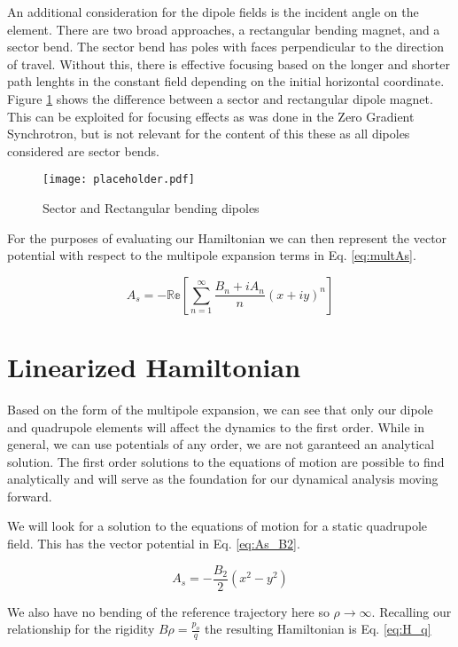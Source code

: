 An additional consideration for the dipole fields is the incident angle on the element. There are two broad approaches, a rectangular bending magnet, and a sector bend. The sector bend has poles with faces perpendicular to the direction of travel. Without this, there is effective focusing based on the longer and shorter path lenghts in the constant field depending on the initial horizontal coordinate. Figure \ref{fig:sector} shows the difference between a sector and rectangular dipole magnet. This can be exploited for focusing effects as was done in the Zero Gradient Synchrotron, but is not relevant for the content of this these as all dipoles considered are sector bends.

\begin{figure} \label{fig:sector}
	\centering
	\texttt{[image: placeholder.pdf]}
	\caption{Sector and Rectangular bending dipoles}
\end{figure}


For the purposes of evaluating our Hamiltonian we can then represent the vector potential with respect to the multipole expansion terms in Eq. \ref{eq:multAs}.

\begin{equation} \label{eq:multAs}
	A_s  =  - \mathbb{Re} \left[ \sum_{n=1}^{\infty} \frac{B_n + i A_n}{n} (x+iy)^n \right]
\end{equation}


\section{Linearized Hamiltonian} \label{sec:linHam}
Based on the form of the multipole expansion, we can see that only our dipole and quadrupole elements will affect the dynamics to the first order. While in general, we can use potentials of any order, we are not garanteed an analytical solution. The first order solutions to the equations of motion are possible to find analytically and will serve as the foundation for our dynamical analysis moving forward.

We will look for a solution to the equations of motion for a static quadrupole field. This has the vector potential in Eq. \ref{eq:As_B2}.

\begin{equation} \label{eq:As_B2}
	A_s = -\frac{B_2}{2}(x^2 - y^2)
\end{equation}

We also have no bending of the reference trajectory here so $\rho \rightarrow \infty$. Recalling our relationship for the rigidity $B\rho = \frac{p_o}{q}$ the resulting Hamiltonian is Eq. \ref{eq:H_q}

